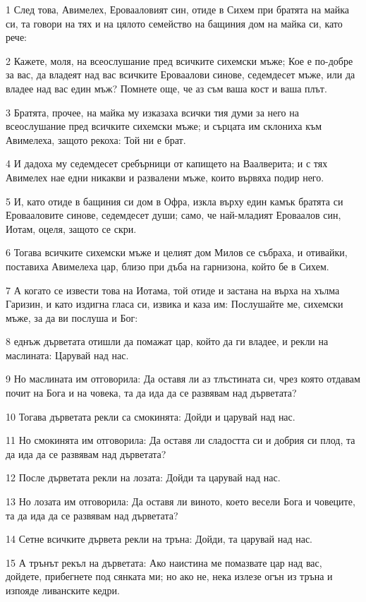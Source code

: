 \par 1 След това, Авимелех, Еровааловият син, отиде в Сихем при братята на майка си, та говори на тях и на цялото семейство на бащиния дом на майка си, като рече:
\par 2 Кажете, моля, на всеослушание пред всичките сихемски мъже; Кое е по-добре за вас, да владеят над вас всичките Ероваалови синове, седемдесет мъже, или да владее над вас един мъж? Помнете още, че аз съм ваша кост и ваша плът.
\par 3 Братята, прочее, на майка му изказаха всички тия думи за него на всеослушание пред всичките сихемски мъже; и сърцата им склониха към Авимелеха, защото рекоха: Той ни е брат.
\par 4 И дадоха му седемдесет сребърници от капището на Ваалверита; и с тях Авимелех нае едни никакви и развалени мъже, които вървяха подир него.
\par 5 И, като отиде в бащиния си дом в Офра, изкла върху един камък братята си Еровааловите синове, седемдесет души; само, че най-младият Ероваалов син, Иотам, оцеля, защото се скри.
\par 6 Тогава всичките сихемски мъже и целият дом Милов се събраха, и отивайки, поставиха Авимелеха цар, близо при дъба на гарнизона, който бе в Сихем.
\par 7 А когато се извести това на Иотама, той отиде и застана на върха на хълма Гаризин, и като издигна гласа си, извика и каза им: Послушайте ме, сихемски мъже, за да ви послуша и Бог:
\par 8 еднъж дърветата отишли да помажат цар, който да ги владее, и рекли на маслината: Царувай над нас.
\par 9 Но маслината им отговорила: Да оставя ли аз тлъстината си, чрез която отдавам почит на Бога и на човека, та да ида да се развявам над дърветата?
\par 10 Тогава дърветата рекли са смокинята: Дойди и царувай над нас.
\par 11 Но смокинята им отговорила: Да оставя ли сладостта си и добрия си плод, та да ида да се развявам над дърветата?
\par 12 После дърветата рекли на лозата: Дойди та царувай над нас.
\par 13 Но лозата им отговорила: Да оставя ли виното, което весели Бога и човеците, та да ида да се развявам над дърветата?
\par 14 Сетне всичките дървета рекли на тръна: Дойди, та царувай над нас.
\par 15 А трънът рекъл на дърветата: Ако наистина ме помазвате цар над вас, дойдете, прибегнете под сянката ми; но ако не, нека излезе огън из тръна и изпояде ливанските кедри.
